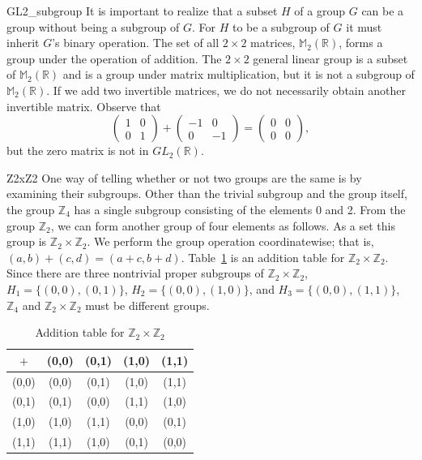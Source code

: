  
\begin{example}{GL2_subgroup}
It is important to realize that a subset $H$ of a group $G$ can be a
group without being a subgroup of $G$. For $H$ to be a subgroup of $G$
it must inherit $G$'s binary operation.  The set of all $2 \times 2$ 
matrices, ${\mathbb M}_2(\mathbb R)$, forms a group under the operation of
addition. The $2 \times 2$ general linear group is a subset of ${\mathbb
M}_2(\mathbb R)$ and is a group under matrix multiplication, but it is not a
subgroup of ${\mathbb M}_2(\mathbb R)$.  If we add two invertible matrices,
we do not necessarily obtain another invertible matrix. Observe that 
\[
\begin{pmatrix}
1 & 0 \\
0 & 1
\end{pmatrix}
+
\begin{pmatrix}
-1 &  0 \\
0  & -1
\end{pmatrix}
=
\begin{pmatrix}
0 & 0 \\
0 & 0
\end{pmatrix},
\]
but the zero matrix is not in $GL_2( {\mathbb R })$.
\end{example}
 
 
\begin{example}{Z2xZ2}
One way of telling whether or not two groups are the same is by
examining their subgroups.  Other than the trivial subgroup and the
group itself, the group ${\mathbb Z}_4$ has a single subgroup consisting
of the elements 0 and 2. From the group ${\mathbb Z}_2$, we can form
another group of four elements as follows.  As a set this group is
${\mathbb Z}_2 \times {\mathbb Z}_2$. We perform the group operation 
coordinatewise; that is, $(a,b) + (c,d) = (a+c, b+d)$. Table~\ref{groups:table_Z2xZ2} is
an addition table for ${\mathbb Z}_2 \times {\mathbb Z}_2$. Since
there are three nontrivial proper subgroups of ${\mathbb Z}_2 \times
{\mathbb Z}_2$, $H_1 = \{ (0,0), (0,1) \}$, $H_2 = \{ (0,0), (1,0) \}$,
and $H_3 = \{ (0,0), (1,1) \}$, ${\mathbb Z}_4$ and ${\mathbb Z}_2 \times
{\mathbb Z}_2$ must be different groups.
\end{example}
 
 
\begin{table}[htb]

{\small
\begin{center}
\begin{tabular}{c|cccc}
$+$     & (0,0) & (0,1) & (1,0) & (1,1) \\
\hline
(0,0) & (0,0) & (0,1) & (1,0) & (1,1) \\
(0,1) & (0,1) & (0,0) & (1,1) & (1,0) \\
(1,0) & (1,0) & (1,1) & (0,0) & (0,1) \\
(1,1) & (1,1) & (1,0) & (0,1) & (0,0)
\end{tabular}
\end{center}
}
\caption{Addition table for ${\mathbb Z}_2 \times {\mathbb Z}_2$}\label{groups:table_Z2xZ2}
\end{table} 
 

